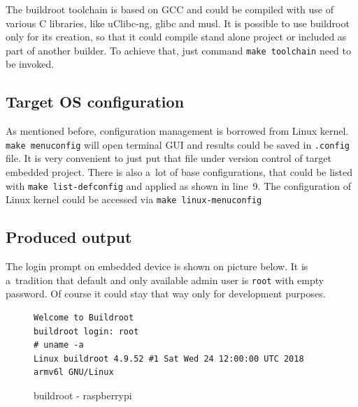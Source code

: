 \documentclass[printmode]{mgr}
\begin{document}
The buildroot toolchain is based on GCC and could be compiled with use of various C libraries, like uClibc-ng, glibc and musl. It is possible to use buildroot only for its creation, so that it could compile stand alone project or included as part of another builder. To achieve that, just command \verb|make toolchain| need to be invoked.

\subsection*{Target OS configuration}

As mentioned before, configuration management is borrowed from Linux kernel.
\verb|make menuconfig| will open terminal GUI and results could be saved in \verb|.config| file.
It is very convenient to just put that file under version control of target embedded project.
There is also a~lot of base configurations, that could be listed with \verb|make list-defconfig| and applied as shown in line~9.
The configuration of Linux kernel could be accessed via \verb|make linux-menuconfig|

\subsection*{Produced output}
The login prompt on embedded device is shown on picture below.
It is a~tradition that default and only available admin user is \verb|root| with empty password.
Of course it could stay that way only for development purposes.

\begin{figure}
    \centering
\begin{verbatim}
Welcome to Buildroot
buildroot login: root
# uname -a
Linux buildroot 4.9.52 #1 Sat Wed 24 12:00:00 UTC 2018 armv6l GNU/Linux
\end{verbatim}
    \caption{buildroot - raspberrypi}
\end{figure}












\end{document}
